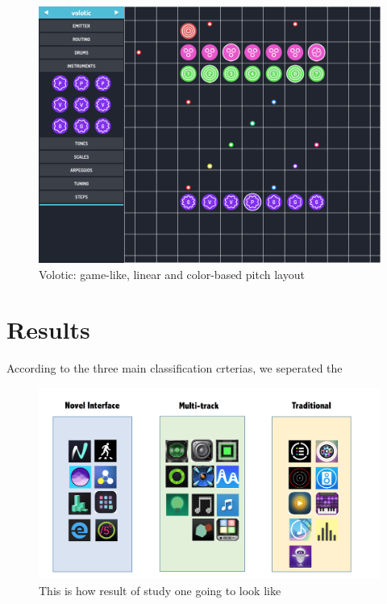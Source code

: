 \bigskip
\begin{figure}[h]
  \includegraphics[width=12 cm]{images/Volotic.PNG}
  \centering
  \caption{Volotic: game-like, linear and color-based pitch layout}
  \label{fig: Volotic}
\end{figure}
\bigskip

\section{Results}

According to the three main classification crterias, we seperated the

\label{sec: result}
\bigskip
\begin{figure}[h]
  \includegraphics[width=\textwidth]{images/Template.png}
  \centering
  \caption{This is how result of study one going to look like}
  \label{fig: Results}
\end{figure}
\bigskip

